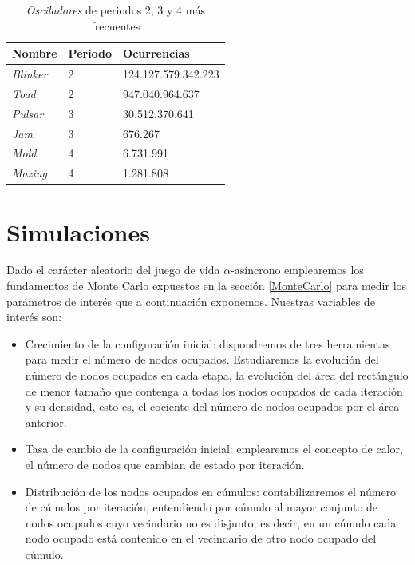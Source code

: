 \documentclass[../proyecto.tex]{memoir}
\begin{document}
\begin{table}
\centering
\begin{tabular}{|l|l|l|}
\hline
\textbf{Nombre}  & \textbf{Periodo} & \textbf{Ocurrencias} \\ \hline
\textit{Blinker} & 2                & 124.127.579.342.223  \\ \hline
\textit{Toad}    & 2                & 947.040.964.637      \\ \hline
\textit{Pulsar}  & 3                & 30.512.370.641       \\ \hline
\textit{Jam}     & 3                & 676.267              \\ \hline
\textit{Mold}    & 4                & 6.731.991            \\ \hline
\textit{Mazing}  & 4                & 1.281.808            \\ \hline
\end{tabular}
\caption{\textit{Osciladores} de periodos 2, 3 y 4 más frecuentes}
\label{tab:osciladores}
\end{table}

\section{Simulaciones} \label{vars}

Dado el carácter aleatorio del juego de vida $\alpha$-asíncrono emplearemos los fundamentos de Monte Carlo expuestos en la sección \ref{MonteCarlo} para medir los parámetros de interés que a continuación exponemos. Nuestras variables de interés son:

\begin{itemize}
\item Crecimiento de la configuración inicial: dispondremos de tres herramientas para medir el número de nodos ocupados. Estudiaremos la evolución del número de nodos ocupados en cada etapa, la evolución del área del rectángulo de menor tamaño que contenga a todas los nodos ocupados de cada iteración y su densidad, esto es, el cociente del número de nodos ocupados por el área anterior.
\item Tasa de cambio de la configuración inicial: emplearemos el concepto de calor, el número de nodos que cambian de estado por iteración.
\item Distribución de los nodos ocupados en cúmulos: contabilizaremos el número de cúmulos por iteración, entendiendo por cúmulo al mayor conjunto de nodos ocupados cuyo vecindario no es disjunto, es decir, en un cúmulo cada nodo ocupado está contenido en el vecindario de otro nodo ocupado del cúmulo.
\end{itemize}
\end{document}
